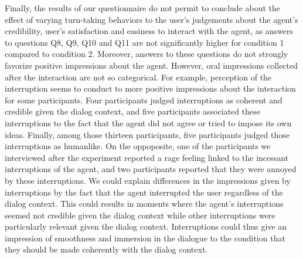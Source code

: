 Finally, the results of our questionnaire do not permit to conclude about the effect of varying turn-taking behaviors to the user's judgements about the agent's credibility, user's satisfaction and easiness to interact with the agent, as answers to questions Q8, Q9, Q10 and Q11 are not significantly higher for condition 1 compared to condition 2. Moreover, answers to these questions do not strongly favorize positive impressions about the agent. However, oral impressions collected after the interaction are not so categorical.   
For example, perception of the interruption seems to conduct to more positive impressions about the interaction for some participants. Four participants judged interruptions as coherent and credible given the dialog context, and five participants associated these interruptions to the fact that the agent did not agree or tried to impose its own ideas. Finally, among those thirteen participants, five participants judged those interruptions as humanlike. On the oppoposite, one of the participants we interviewed after the experiment reported a rage feeling linked to the incessant interruptions of the agent, and two participants reported that they were annoyed by these interruptions. We could explain differences in the impressions given by interruptions by the fact that the agent interrupted the user regardless of the dialog context. This could results in moments where the agent's interruptions seemed not credible given the dialog context while other interruptions were particularly relevant given the dialog context. Interruptions could thus give an impression of smoothness and immersion in the dialogue to the condition that they should be made coherently with the dialog context. 



